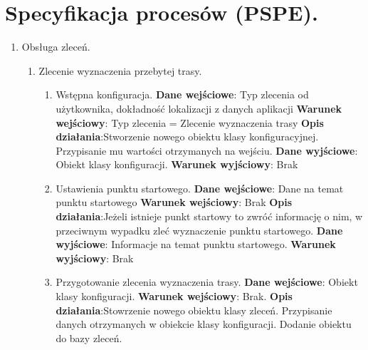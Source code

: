 \documentclass[11pt]{article}
\begin{document}
	\section{Specyfikacja procesów (PSPE).}
	\begin{enumerate}
		\item Obsługa zleceń.
		\begin{enumerate}[label*=\arabic*.]
			\item Zlecenie wyznaczenia przebytej trasy.
			\begin{enumerate}[label*=\arabic*.]
				\item Wstępna konfiguracja. \newline
				\textbf{Dane wejściowe}: Typ zlecenia od użytkownika, dokładność lokalizacji z danych aplikacji	\newline
				\textbf{Warunek wejściowy}: Typ zlecenia = Zlecenie wyznaczenia trasy		\newline   	
				\textbf{Opis działania}:\newline Stworzenie nowego obiektu klasy konfiguracyjnej. \newline Przypisanie mu wartości otrzymanych na wejściu.	\newline
				\textbf{Dane wyjściowe}: Obiekt klasy konfiguracji.	\newline
				\textbf{Warunek wyjściowy}: Brak
				\item Ustawienia punktu startowego. \newline
				\textbf{Dane wejściowe}: Dane na temat punktu startowego	\newline
				\textbf{Warunek wejściowy}: Brak		\newline   	
				\textbf{Opis działania}:\newline Jeżeli istnieje punkt startowy to zwróć informację o nim, w przeciwnym wypadku zleć wyznaczenie punktu startowego. 	\newline
				\textbf{Dane wyjściowe}: Informacje na temat punktu startowego.	\newline
				\textbf{Warunek wyjściowy}: Brak
				\item Przygotowanie zlecenia wyznaczenia trasy. \newline
				\textbf{Dane wejściowe}: Obiekt klasy konfiguracji.	\newline
				\textbf{Warunek wejściowy}: Brak.		\newline   	
				\textbf{Opis działania}:\newline Stowrzenie nowego obiektu klasy zleceń.
				\newline Przypisanie danych otrzymanych w obiekcie klasy konfiguracji. \newline Dodanie obiektu do bazy zleceń.	\newline

\end{enumerate}
\end{enumerate}
\end{enumerate}
\end{document}
